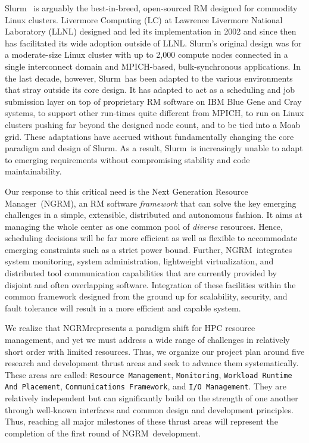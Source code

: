 \documentclass{article}
\newcommand{\ngrm}{NGRM}
\newcommand{\ngrmfull}{Next Generation Resource Manager}
\newcommand{\slurm}{Slurm}
\newcommand{\moab}{Moab}
\begin{document}
\slurm~\cite{SlurmDesign} is arguably the
best-in-breed, open-sourced RM designed for commodity Linux clusters.
Livermore Computing (LC) at Lawrence Livermore National Laboratory (LLNL)
designed and led its implementation in 2002 and since then has facilitated
its wide adoption outside of LLNL.
\slurm's original design was for a moderate-size Linux cluster with up to 2,000 
compute nodes connected in a single interconnect domain and MPICH-based, 
bulk-synchronous applications.
In the last decade, however, \slurm\ has been adapted to the various
environments that stray outside its core design.
It has adapted to act as a scheduling and job submission layer
on top of proprietary RM software on IBM Blue Gene and Cray systems,
to support other run-times quite different from MPICH,
to run on Linux clusters pushing far beyond the designed node count,
and to be tied into a \moab~\cite{MOAB:online} grid.
These adaptations have accrued without fundamentally changing the
core paradigm and design of \slurm. As a result, \slurm\ is increasingly
unable to adapt to emerging requirements without compromising
stability and code maintainability.

Our response to this critical need is the \ngrmfull\ (\ngrm ), an RM software
{\em framework} that can solve the key emerging challenges 
in a simple, extensible, distributed and autonomous fashion.
It aims at managing the whole center as one common pool of {\em diverse} 
resources. Hence, scheduling decisions will be 
far more efficient as well as flexible to accommodate 
emerging constraints such as a strict power bound. 
Further, \ngrm\ integrates
system monitoring, system administration, lightweight
virtualization, and distributed tool communication capabilities
that are currently provided by disjoint and often overlapping software.
Integration of these facilities within the common framework designed from
the ground up for scalability, security, and fault tolerance will result
in a more efficient and capable system.

We realize that \ngrm represents a paradigm shift for HPC resource management, 
and yet we must address a wide range of challenges in relatively short order
with limited resources. Thus, we 
organize our project plan around five research and development thrust areas 
and seek to advance them systematically.
These areas are called:
{\tt Resource Management},
{\tt Monitoring},
{\tt Workload Runtime And Placement}, 
{\tt Communications Framework}, and
{\tt I/O Management}.
They are relatively independent but can significantly build on the
strength of one another through well-known interfaces and common design
and development principles.
Thus, reaching all major milestones of these thrust areas 
will represent the completion of the first round of \ngrm\ development. 
\end{document}
